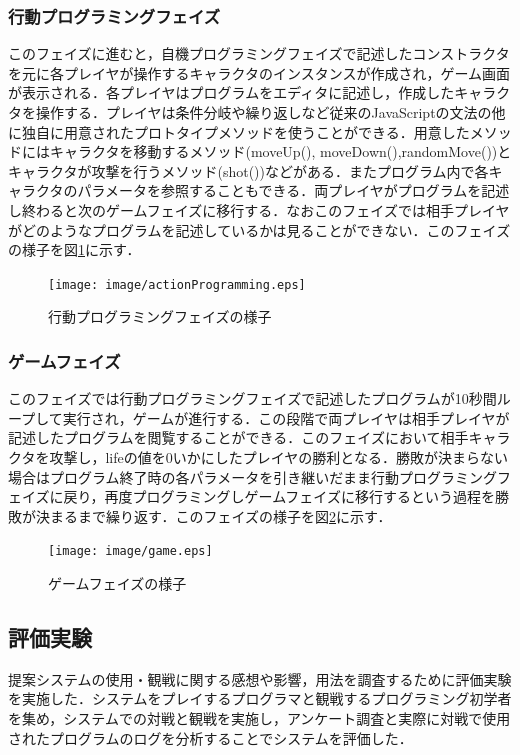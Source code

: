 \subsubsection{行動プログラミングフェイズ}
このフェイズに進むと，自機プログラミングフェイズで記述したコンストラクタを元に各プレイヤが操作するキャラクタのインスタンスが作成され，ゲーム画面が表示される．各プレイヤはプログラムをエディタに記述し，作成したキャラクタを操作する．プレイヤは条件分岐や繰り返しなど従来のJavaScriptの文法の他に独自に用意されたプロトタイプメソッドを使うことができる．用意したメソッドにはキャラクタを移動するメソッド(moveUp(), moveDown(),randomMove())とキャラクタが攻撃を行うメソッド(shot())などがある．またプログラム内で各キャラクタのパラメータを参照することもできる．両プレイヤがプログラムを記述し終わると次のゲームフェイズに移行する．なおこのフェイズでは相手プレイヤがどのようなプログラムを記述しているかは見ることができない．このフェイズの様子を図\ref{actionProgramming}に示す．

\begin{figure}[!h]
  \begin{center}
    \texttt{[image: image/actionProgramming.eps]}
  \end{center}
    \vspace{-8mm} 
  \caption{行動プログラミングフェイズの様子}
  \label{actionProgramming}
\end{figure}

\subsubsection{ゲームフェイズ}
このフェイズでは行動プログラミングフェイズで記述したプログラムが10秒間ループして実行され，ゲームが進行する．この段階で両プレイヤは相手プレイヤが記述したプログラムを閲覧することができる．このフェイズにおいて相手キャラクタを攻撃し，lifeの値を0いかにしたプレイヤの勝利となる．勝敗が決まらない場合はプログラム終了時の各パラメータを引き継いだまま行動プログラミングフェイズに戻り，再度プログラミングしゲームフェイズに移行するという過程を勝敗が決まるまで繰り返す．このフェイズの様子を図\ref{game}に示す．

\begin{figure}[!h]
  \begin{center}
    \texttt{[image: image/game.eps]}
  \end{center}
    \vspace{-8mm} 
  \caption{ゲームフェイズの様子}
  \label{game}
\end{figure}

\subsection{評価実験}
提案システムの使用・観戦に関する感想や影響，用法を調査するために評価実験を実施した．システムをプレイするプログラマと観戦するプログラミング初学者を集め，システムでの対戦と観戦を実施し，アンケート調査と実際に対戦で使用されたプログラムのログを分析することでシステムを評価した．

